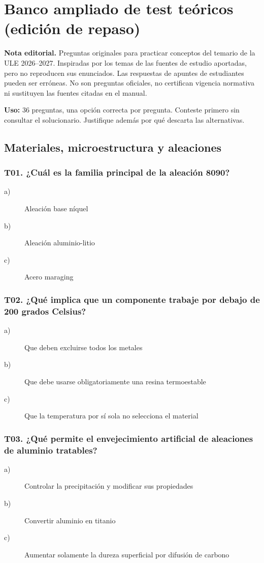 \chapter{Banco ampliado de test teóricos (edición de repaso)}
\label{ch:test-matmo-2026}
\noindent\textbf{Nota editorial.} Preguntas originales para practicar conceptos del temario de la ULE 2026--2027. Inspiradas por los temas de las fuentes de estudio aportadas, pero no reproducen sus enunciados. Las respuestas de apuntes de estudiantes pueden ser erróneas. No son preguntas oficiales, no certifican vigencia normativa ni sustituyen las fuentes citadas en el manual.

\noindent\textbf{Uso:} 36 preguntas, una opción correcta por pregunta. Conteste primero sin consultar el solucionario. Justifique además por qué descarta las alternativas.

\section*{Materiales, microestructura y aleaciones}
\subsection*{T01. ¿Cuál es la familia principal de la aleación 8090?}
\begin{description}
\item[a)] Aleación base níquel
\item[b)] Aleación aluminio-litio
\item[c)] Acero maraging
\end{description}

\subsection*{T02. ¿Qué implica que un componente trabaje por debajo de 200 grados Celsius?}
\begin{description}
\item[a)] Que deben excluirse todos los metales
\item[b)] Que debe usarse obligatoriamente una resina termoestable
\item[c)] Que la temperatura por sí sola no selecciona el material
\end{description}

\subsection*{T03. ¿Qué permite el envejecimiento artificial de aleaciones de aluminio tratables?}
\begin{description}
\item[a)] Controlar la precipitación y modificar sus propiedades
\item[b)] Convertir aluminio en titanio
\item[c)] Aumentar solamente la dureza superficial por difusión de carbono
\end{description}

